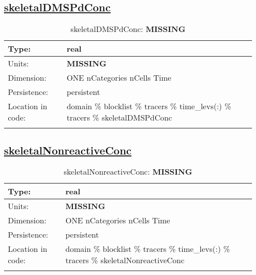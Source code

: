 \subsection[skeletalDMSPdConc]{\hyperref[sec:var_tab_tracers]{skeletalDMSPdConc}}
\label{subsec:var_sec_tracers_skeletalDMSPdConc}
\begin{center}
\begin{longtable}{| p{2.0in} | p{4.0in} |}
        \hline 
        Type: & real \\
        \hline 
        Units: & {\bf \color{red} MISSING} \\
        \hline 
        Dimension: & ONE nCategories nCells Time \\
        \hline 
        Persistence: & persistent \\
        \hline 
         Location in code: & domain \% blocklist \% tracers \% time\_levs(:) \% tracers \% skeletalDMSPdConc \\
         \hline 
    \caption{skeletalDMSPdConc: {\bf \color{red} MISSING}}
\end{longtable}
\end{center}
\subsection[skeletalNonreactiveConc]{\hyperref[sec:var_tab_tracers]{skeletalNonreactiveConc}}
\label{subsec:var_sec_tracers_skeletalNonreactiveConc}
\begin{center}
\begin{longtable}{| p{2.0in} | p{4.0in} |}
        \hline 
        Type: & real \\
        \hline 
        Units: & {\bf \color{red} MISSING} \\
        \hline 
        Dimension: & ONE nCategories nCells Time \\
        \hline 
        Persistence: & persistent \\
        \hline 
         Location in code: & domain \% blocklist \% tracers \% time\_levs(:) \% tracers \% skeletalNonreactiveConc \\
         \hline 
    \caption{skeletalNonreactiveConc: {\bf \color{red} MISSING}}
\end{longtable}
\end{center}
